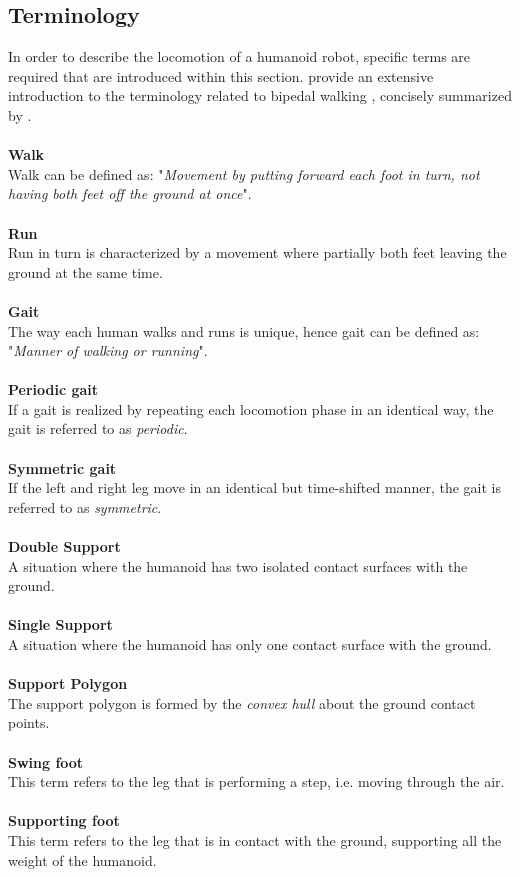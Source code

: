 \subsection{Terminology}
In order to describe the locomotion of a humanoid robot, specific terms are required that are introduced within this section. \citeauthor{vukobratovic2007towards} provide an extensive introduction to the terminology related to bipedal walking \cite{vukobratovic2007towards}, concisely summarized by \citeauthor{dekker2009zero} \cite{dekker2009zero}.\\\\
\textbf{Walk}\\
Walk can be defined as: "\textit{Movement by putting forward each foot in turn, not having both feet off the ground at once}".\\\\
\textbf{Run}\\
Run in turn is characterized by  a movement where partially both feet leaving the ground at the same time.\\\\
\textbf{Gait}\\
The way each human walks and runs is unique, hence gait can be defined as: "\textit{Manner of walking or running}".\\\\
\textbf{Periodic gait}\\
If a gait is realized by repeating each locomotion phase in an identical way, the gait is referred to as \textit{periodic}.\\\\
\textbf{Symmetric gait}\\
If the left and right leg move in an identical but time-shifted manner, the gait is referred to as \textit{symmetric}.\\\\
\textbf{Double Support}\\
A situation where the humanoid has two isolated contact surfaces with the ground.\\\\
\textbf{Single Support}\\
A situation where  the humanoid has only one contact surface with the ground.\\\\
\textbf{Support Polygon}\\%
The support polygon is formed by the \textit{convex hull} about the ground contact points.    \\\\
\textbf{Swing foot}\\
This term refers to the leg that is performing a step, i.e. moving through the air.\\\\
\textbf{Supporting foot}\\
This term refers to the leg that is in contact with the ground, supporting all the weight of the humanoid. 

